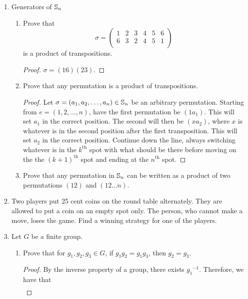 \documentclass[../apprentice.tex]{subfiles}
\begin{document}
\begin{enumerate}
    \item Generators of $\mathbb{S}_n$
    \begin{enumerate}
        \item Prove that
        \begin{equation*}
            \sigma =
            \begin{pmatrix}
                1 & 2 & 3 & 4 & 5 & 6\\
                6 & 3 & 2 & 4 & 5 & 1\\
            \end{pmatrix}
        \end{equation*}
        is a product of transpositions.
        \begin{proof}
            $\sigma=(16)(23)$.
        \end{proof}
        \item Prove that any permutation is a product of transpositions.
        \begin{proof}
            Let $\sigma=(a_1,a_2,\dots,a_n)\in\mathbb{S}_n$ be an arbitrary permutation. Starting from $e=(1,2,\dots,n)$, have the first permutation be $(1a_1)$. This will set $a_1$ in the correct position. The second will then be $(xa_2)$, where $x$ is whatever is in the second position after the first transposition. This will set $a_2$ in the correct position. Continue down the line, always switching whatever is in the $k^\text{th}$ spot with what should be there before moving on the the $(k+1)^\text{th}$ spot and ending at the $n^\text{th}$ spot.
        \end{proof}
        \item Prove that any permutation in $\mathbb{S}_n$ can be written as a product of two permutations $(12)$ and $(12\dots n)$.
    \end{enumerate}
    \item Two players put 25 cent coins on the round table alternately. They are allowed to put a coin on an empty spot only. The person, who cannot make a move, loses the game. Find a winning strategy for one of the players.
    \item Let $G$ be a finite group.
    \begin{enumerate}
        \item Prove that for $g_1,g_2,g_3\in G$, if $g_1g_2=g_1g_3$, then $g_2=g_3$.
        \begin{proof}
            By the inverse property of a group, there exists ${g_1}^{-1}$. Therefore, we have that
            \begin{align*}

\end{align*}
\end{proof}
\end{enumerate}
\end{enumerate}
\end{document}
